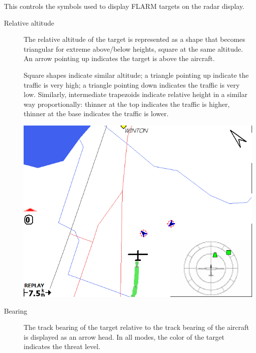 \documentclass[a4paper,12pt]{refrep}
\begin{document}
This controls the symbols used to display FLARM targets on the radar
display.
\begin{description}
\item[Relative altitude] 
The relative altitude of the target is represented as a shape that
becomes triangular for extreme above/below heights, square at the same
altitude.  An arrow pointing up indicates the target is above the
aircraft.

Square shapes indicate similar altitude; a triangle pointing up
indicate the traffic is very high; a triangle pointing down indicates
the traffic is very low.  Similarly, intermediate trapezoids indicate
relative height in a similar way proportionally: thinner at the top
indicates the traffic is higher, thinner at the base indicates the
traffic is lower.

\begin{center}
\includegraphics[angle=0,width=\linewidth,keepaspectratio='true']{figures/flarmmap-alt2.png}
\end{center}

\item[Bearing] The track bearing of the target relative to the track bearing of the aircraft is displayed as an arrow head.
In all modes, the color of the target indicates the threat level.


\end{description}
\end{document}
